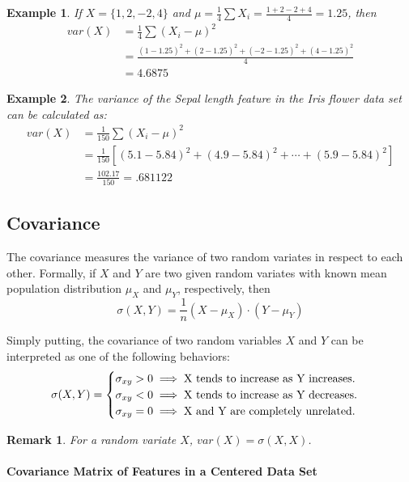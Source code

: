 \documentclass[12pt]{report}
\newtheorem{remark}{Remark}[section]
\newtheorem{example}{Example}[section]
\begin{document}
\begin{example}
	If $X=\{1, 2, -2, 4\}$ and $\mu = \frac{1}{4} \sum X_i = \frac{1+2-2+4}{4} = 1.25$, then
	\begin{align*}
	var(X) &= \frac{1}{4} \sum (X_i - \mu)^2 \\
	&= \frac{(1-1.25)^2 + (2-1.25)^2 + (-2-1.25)^2 + (4-1.25)^2}{4} \\
	&= 4.6875
	\end{align*}
\end{example}

\begin{example}
	The variance of the Sepal length feature in the Iris flower data set can be calculated as:
	\begin{align*}
	var(X) &= \frac{1}{150} \sum (X_i - \mu)^2 \\
	&= \frac{1}{150} [(5.1-5.84)^2 + (4.9-5.84)^2 + \cdots + (5.9-5.84)^2] \\
	&= \frac{102.17}{150} = .681122
	\end{align*}
\end{example}

\subsection{Covariance}

The covariance measures the variance of two random variates in respect to each other. Formally, if $X$ and $Y$ are two given random variates with known mean population distribution $\mu_X$ and $\mu_Y$, respectively, then
$$\sigma(X, Y) = \frac{1}{n} (X - \mu_X) \cdot (Y - \mu_Y) $$

Simply putting, the covariance of two random variables $X$ and $Y$ can be interpreted as one of the following behaviors:
$$
\sigma(X,Y) = \begin{cases}
\sigma_{xy} > 0 \implies \textnormal{X tends to increase as Y increases.}\\
\sigma_{xy} < 0 \implies \textnormal{X tends to increase as Y decreases.}\\
\sigma_{xy} = 0 \implies \textnormal{X and Y are completely unrelated.}
\end{cases}
$$

\begin{remark}
	For a random variate $X$, $var(X) = \sigma(X, X)$.
\end{remark}

\paragraph{Covariance Matrix of Features in a Centered Data Set}
\end{document}
